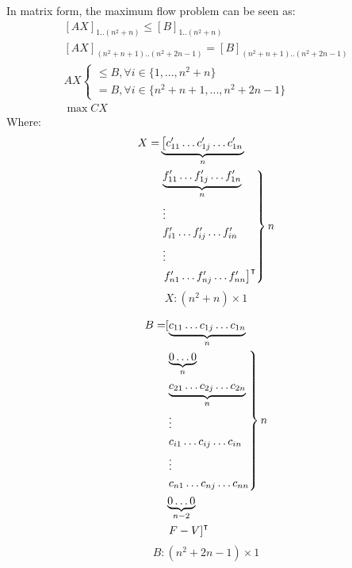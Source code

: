 In matrix form, the maximum flow problem can be seen as:
\begin{equation*}
\begin{gathered}
  \left[AX\right]_{1..\left(n^2 + n\right)} \leq \left[B\right]_{1..\left(n^2 + n\right)} \\
  \left[AX\right]_{\left(n^2 + n + 1\right)..\left(n^2 + 2n - 1\right)} = \left[B\right]_{\left(n^2 + n +
  1\right)..\left(n^2 + 2n - 1\right)} \\
  AX
  \begin{cases}
    \leq B, \forall i \in \{1, ..., n^2 + n\} \\
    = B, \forall i \in \{n^2 + n + 1, ..., n^2 + 2n - 1\}
  \end{cases} \\
  \max{CX}
\end{gathered}
\end{equation*}
Where:
\begin{align*}
  X = &\underbrace{\left[c'_{11} \dots c'_{1j} \dots c'_{1n} \right.}_{n} \\
    &\begin{rcases}
      \underbrace{f'_{11} \dots f'_{1j} \dots f'_{1n}}_{n} \\
      \vdots \\
      f'_{i1} \dots f'_{ij} \dots f'_{in} \\
      \vdots \\
      \left. f'_{n1} \dots f'_{nj} \dots f'_{nn} \right]^\intercal
    \end{rcases} n
\end{align*}
\begin{equation*}
  X : \left(n^2 + n\right) \times 1
\end{equation*}

\begin{align*}
  B = &[\underbrace{c_{11} \dots c_{1j} \dots c_{1n}}_{n} \\
    &\begin{rcases}
      \underbrace{0 \dots 0}_{n} \\
      \underbrace{c_{21} \dots c_{2j} \dots c_{2n}}_{n} \\
      \vdots \\
      c_{i1} \dots c_{ij} \dots c_{in} \\
      \vdots \\
      c_{n1} \dots c_{nj} \dots c_{nn}
    \end{rcases} n \\
    &\underbrace{0 \dots 0}_{n-2} \\
    &\left. F - V \right]^\intercal
\end{align*}
\begin{equation*}
  B : \left(n^2 + 2n - 1\right) \times 1
\end{equation*}

